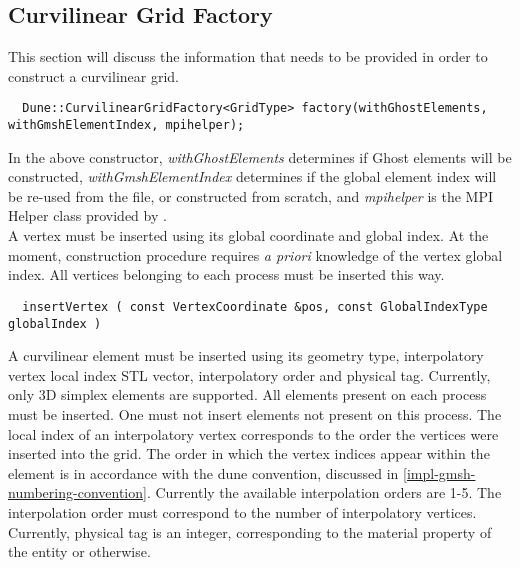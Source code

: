 \subsection{Curvilinear Grid Factory}
\label{interface-grid-factory}

This section will discuss the information that needs to be provided in order to construct a curvilinear grid.

\begin{mybox}
\begin{lstlisting}
  Dune::CurvilinearGridFactory<GridType> factory(withGhostElements, withGmshElementIndex, mpihelper);
\end{lstlisting}
\end{mybox}

\noindent
In the above constructor, \textit{withGhostElements} determines if Ghost elements will be constructed, \textit{withGmshElementIndex} determines if the global element index will be re-used from the \gmsh{} file, or constructed from scratch, and \textit{mpihelper} is the MPI Helper class provided by \dune{}. \\

\noindent
A vertex must be inserted using its global coordinate and global index. At the moment, \curvgrid{} construction procedure requires \textit{a priori} knowledge of the vertex global index. All vertices belonging to each process must be inserted this way.

\begin{mybox}
\begin{lstlisting}
  insertVertex ( const VertexCoordinate &pos, const GlobalIndexType globalIndex )
\end{lstlisting}
\end{mybox}

\noindent
A curvilinear element must be inserted using its geometry type, interpolatory vertex local index STL vector, interpolatory order and physical tag. Currently, only 3D simplex elements are supported. All elements present on each process must be inserted. One must not insert elements not present on this process. The local index of an interpolatory vertex corresponds to the order the vertices were inserted into the grid. The order in which the vertex indices appear within the element is in accordance with the dune convention, discussed in \cref{impl-gmsh-numbering-convention}. Currently the available interpolation orders are 1-5. The interpolation order must correspond to the number of interpolatory vertices. Currently, physical tag is an integer, corresponding to the material property of the entity or otherwise.

